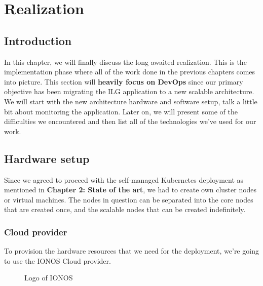 \chapter{Realization}
\newpage

\setcounter{secnumdepth}{0} %
\section{Introduction}
In this chapter, we will finally discuss the long awaited realization.
This is the implementation phase where all of the work done in the previous chapters comes into picture.
This section will {\bf heavily focus on DevOps} since our primary objective has been migrating the ILG application to a new scalable architecture.
We will start with the new architecture hardware and software setup, talk a little bit about monitoring the application.
Later on, we will present some of the difficulties we encountered and then list all of the technologies we've used for our work.

\setcounter{secnumdepth}{2} %
\section{Hardware setup}
Since we agreed to proceed with the self-managed Kubernetes deployment as mentioned in \textbf{Chapter 2: State of the art}, we had to create own cluster nodes or virtual machines.
The nodes in question can be separated into the core nodes that are created once, and the scalable nodes that can be created indefinitely.

\subsection{Cloud provider}
To provision the hardware resources that we need for the deployment, we're going  to use the IONOS Cloud provider.
\cite[Ionos is a web hosting company founded in Germany in 1988 and is currently owned by United Internet.]{ionos-wikipedia}
\begin{figure}[H]
    \centering
    \caption{Logo of IONOS}
    \label{fig:logo-of-ionos-cloud}
\end{figure}

